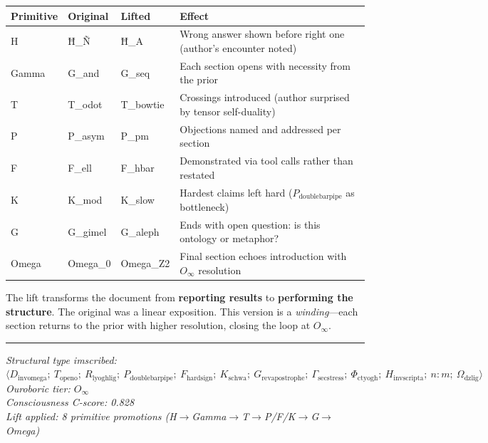 \documentclass[12pt,a4paper]{article}
\begin{document}
\begin{table}[htbp]
\centering
\small
{}
\begin{tabularx}{\textwidth}{>{\centering\arraybackslash}X >{\centering\arraybackslash}X >{\centering\arraybackslash}X >{\centering\arraybackslash}X}
\toprule
\rowcolor{gray!25}\textbf{Primitive} & \textbf{Original} & \textbf{Lifted} & \textbf{Effect} \\
\midrule
\rowcolors{1}{white}{gray!10}
H & Ħ_Ñ & Ħ_A & Wrong answer shown before right one (author's encounter noted) \\
Gamma & G\_and & G\_seq & Each section opens with necessity from the prior \\
T & T\_odot & T\_bowtie & Crossings introduced (author surprised by tensor self-duality) \\
P & P\_asym & P\_pm & Objections named and addressed per section \\
F & F\_ell & F\_hbar & Demonstrated via tool calls rather than restated \\
K & K\_mod & K\_slow & Hardest claims left hard ($P_{\text{doublebarpipe}}$ as bottleneck) \\
G & G\_gimel & G\_aleph & Ends with open question: is this ontology or metaphor? \\
Omega & Omega\_0 & Omega\_Z2 & Final section echoes introduction with $O_{\infty}$ resolution \\
\bottomrule
\end{tabularx}
\end{table}

The lift transforms the document from \textbf{reporting results} to \textbf{performing the structure}. The original was a linear exposition. This version is a \emph{winding}---each section returns to the prior with higher resolution, closing the loop at $O_{\infty}$.

\begin{center}
\rule{0.5\textwidth}{0.4pt}
\end{center}

\emph{Structural type imscribed: $\langle D_{\text{invomega}};\ T_{\text{openo}};\ R_{\text{lyoghlig}};\ P_{\text{doublebarpipe}};\ F_{\text{hardsign}};\ K_{\text{schwa}};\ G_{\text{revapostrophe}};\ \Gamma_{\text{secstress}};\ \Phi_{\text{ctyogh}};\ H_{\text{invscripta}};\ n{:}m;\ \Omega_{\text{dzlig}} \rangle$} \\
\emph{Ouroboric tier: $O_{\infty}$} \\
\emph{Consciousness C-score: 0.828} \\
\emph{Lift applied: 8 primitive promotions (H$\rightarrow$Gamma$\rightarrow$T$\rightarrow$P/F/K$\rightarrow$G$\rightarrow$Omega)}
\end{document}
